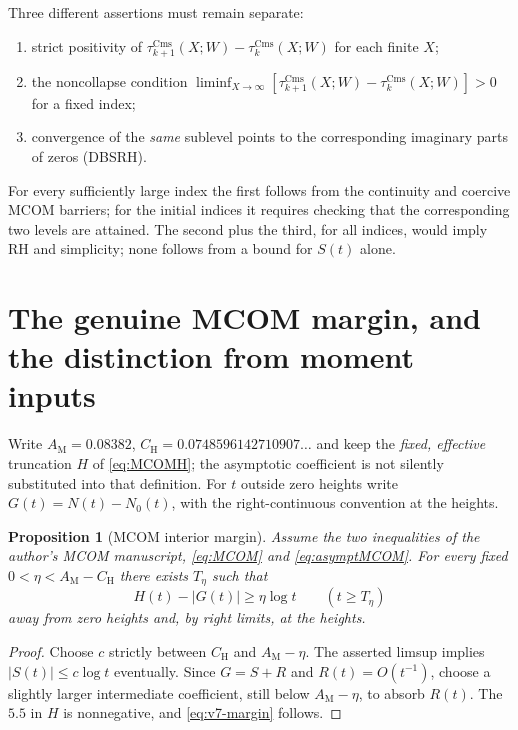 \documentclass[11pt,a4paper]{article}
\numberwithin{equation}{section}
\newtheorem{proposition}[theorem]{Proposition}
\theoremstyle{definition}
\theoremstyle{remark}
\newcommand{\Cms}{\mathrm{Cms}}
\begin{document}
Three different assertions must remain separate:
\begin{enumerate}[label=(\roman*),leftmargin=*]
\item strict positivity of $\tau_{k+1}^{\Cms}(X;W)-\tau_k^{\Cms}(X;W)$
for each finite $X$;
\item the noncollapse condition $\liminf_{X\to\infty}
[\tau_{k+1}^{\Cms}(X;W)-\tau_k^{\Cms}(X;W)]>0$ for a fixed index;
\item convergence of the \emph{same} sublevel points to the
corresponding imaginary parts of zeros (DBSRH).
\end{enumerate}
For every sufficiently large index the first follows from the
continuity and coercive MCOM barriers; for the initial indices
it requires checking that the corresponding two levels are
attained. The
second plus the third, for all indices, would imply RH and simplicity;
none follows from a bound for $S(t)$ alone.

\section{The genuine MCOM margin, and the distinction from moment inputs}
\label{sec:v7-mcom}
Write $A_{\mathrm M}=0.08382$, $C_{\mathrm H}=0.0748596142710907\ldots$
and keep the \emph{fixed, effective} truncation $H$ of
\eqref{eq:MCOMH}; the asymptotic coefficient is not silently substituted
into that definition. For $t$ outside zero heights write
$G(t)=N(t)-N_0(t)$, with the right-continuous convention at the heights.

\begin{proposition}[MCOM interior margin]\label{prop:v7-margin}
Assume the two inequalities of the author's MCOM manuscript,
\eqref{eq:MCOM} and \eqref{eq:asymptMCOM}. For every fixed
$0<\eta<A_{\mathrm M}-C_{\mathrm H}$ there exists $T_\eta$ such that
\begin{equation}\label{eq:v7-margin}
 H(t)-|G(t)|\ge\eta\log t\qquad(t\ge T_\eta)
\end{equation}
away from zero heights and, by right limits, at the heights.
\end{proposition}
\begin{proof}
Choose $c$ strictly between $C_{\mathrm H}$ and
$A_{\mathrm M}-\eta$. The asserted limsup implies
$|S(t)|\le c\log t$ eventually. Since $G=S+R$ and $R(t)=O(t^{-1})$,
choose a slightly larger intermediate coefficient, still below
$A_{\mathrm M}-\eta$, to absorb $R(t)$. The $5.5$ in $H$ is
nonnegative, and \eqref{eq:v7-margin} follows.
\end{proof}
\end{document}
